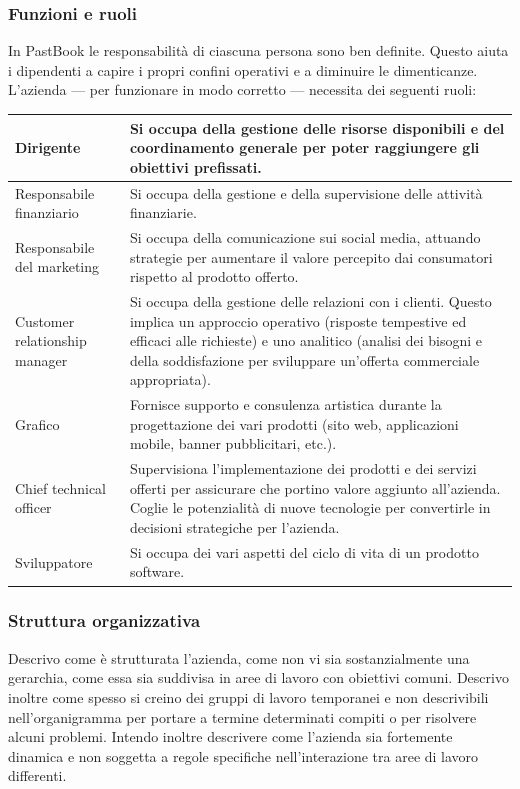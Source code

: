 			\subsubsection{Funzioni e ruoli}
				In PastBook le responsabilità di ciascuna persona sono ben definite. Questo aiuta i dipendenti a capire i propri
				confini operativi e a diminuire le dimenticanze.\\
				L'azienda — per funzionare in modo corretto — necessita dei seguenti ruoli:
				\begin{center}
					\begin{tabular}[H]{p{} p{}}
						Dirigente 			& Si occupa della gestione delle risorse disponibili e del
										  coordinamento generale per poter raggiungere gli obiettivi
										  prefissati.\\
						\hline
						Responsabile finanziario	& Si occupa della gestione e della supervisione delle attività
										  finanziarie.\\
						\hline
						Responsabile del marketing	& Si occupa della comunicazione sui social media, attuando strategie
										  per aumentare il valore percepito dai consumatori rispetto al
										  prodotto offerto.\\
						\hline
						Customer relationship manager	& Si occupa della gestione delle relazioni con i clienti. Questo
										  implica un approccio operativo (risposte tempestive ed efficaci
										  alle richieste) e uno analitico (analisi dei bisogni e della
										  soddisfazione per sviluppare un'offerta commerciale appropriata).\\
						\hline
						Grafico				& Fornisce supporto e consulenza artistica durante la progettazione
										  dei vari prodotti (sito web, applicazioni mobile, banner
										  pubblicitari, etc.).\\
						\hline
						Chief technical officer		& Supervisiona l'implementazione dei prodotti e dei servizi offerti
										  per assicurare che portino valore aggiunto all'azienda. Coglie le
										  potenzialità di nuove tecnologie per convertirle in decisioni
										  strategiche per l'azienda.\\
						\hline
						Sviluppatore 			& Si occupa dei vari aspetti del ciclo di vita di un prodotto
										  software.\\
					\end{tabular}
				\end{center}
			\subsubsection{Struttura organizzativa}
				Descrivo come è strutturata l'azienda, come non vi sia sostanzialmente una gerarchia, come essa sia suddivisa in
				aree di lavoro con obiettivi comuni. Descrivo inoltre come spesso si creino dei gruppi di lavoro temporanei e non
				descrivibili nell'organigramma per portare a termine determinati compiti o per risolvere alcuni problemi. Intendo
				inoltre descrivere come l'azienda sia fortemente dinamica e non soggetta a regole specifiche nell'interazione tra
				aree di lavoro differenti.
